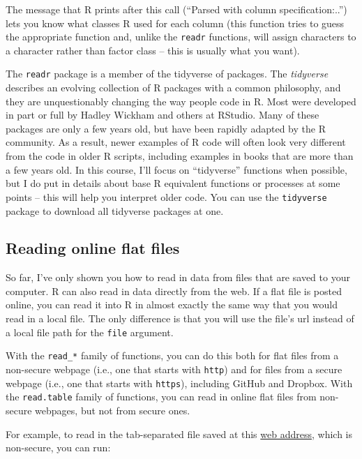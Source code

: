 \documentclass[]{book}
\makeatletter
\newenvironment{kframe}{%
\medskip{}
\setlength{\fboxsep}{.8em}
 \def\at@end@of@kframe{}%
 \ifinner\ifhmode%
  \def\at@end@of@kframe{\end{minipage}}%
  \begin{minipage}{\columnwidth}%
 \fi\fi%
 \def\FrameCommand##1{\hskip\@totalleftmargin \hskip-\fboxsep
 \colorbox{shadecolor}{##1}\hskip-\fboxsep
     \hskip-\linewidth \hskip-\@totalleftmargin \hskip\columnwidth}%
 \MakeFramed {\advance\hsize-\width
   \@totalleftmargin\z@ \linewidth\hsize
   \@setminipage}}%
 {\par\unskip\endMakeFramed%
 \at@end@of@kframe}
\newenvironment{rmdblock}[1]
  {
  \begin{itemize}
  \renewcommand{\labelitemi}{
    \raisebox{-.7\height}[0pt][0pt]{
      {\setkeys{Gin}{width=3em,keepaspectratio}\texttt{[image: images/\#1]}}
    }
  }
  \setlength{\fboxsep}{1em}
  \begin{kframe}
  \item
  }
  {
  \end{kframe}
  \end{itemize}
  }
\newenvironment{rmdnote}
  {\begin{rmdblock}{note}}
  {\end{rmdblock}}
\makeatother
\begin{document}
The message that R prints after this call (``Parsed with column
specification:..'') lets you know what classes R used for each column
(this function tries to guess the appropriate function and, unlike the
\texttt{readr} functions, will assign characters to a character rather
than factor class -- this is usually what you want).

\begin{rmdnote}
The \texttt{readr} package is a member of the tidyverse of packages. The
\emph{tidyverse} describes an evolving collection of R packages with a
common philosophy, and they are unquestionably changing the way people
code in R. Most were developed in part or full by Hadley Wickham and
others at RStudio. Many of these packages are only a few years old, but
have been rapidly adapted by the R community. As a result, newer
examples of R code will often look very different from the code in older
R scripts, including examples in books that are more than a few years
old. In this course, I'll focus on ``tidyverse'' functions when
possible, but I do put in details about base R equivalent functions or
processes at some points -- this will help you interpret older code. You
can use the \texttt{tidyverse} package to download all tidyverse
packages at one.
\end{rmdnote}

\subsection{Reading online flat files}\label{reading-online-flat-files}

So far, I've only shown you how to read in data from files that are
saved to your computer. R can also read in data directly from the web.
If a flat file is posted online, you can read it into R in almost
exactly the same way that you would read in a local file. The only
difference is that you will use the file's url instead of a local file
path for the \texttt{file} argument.

With the \texttt{read\_*} family of functions, you can do this both for
flat files from a non-secure webpage (i.e., one that starts with
\texttt{http}) and for files from a secure webpage (i.e., one that
starts with \texttt{https}), including GitHub and Dropbox. With the
\texttt{read.table} family of functions, you can read in online flat
files from non-secure webpages, but not from secure ones.

For example, to read in the tab-separated file saved at this
\href{http://www2.unil.ch/comparativegenometrics/docs/NC_006368.txt}{web
address}, which is non-secure, you can run:
\end{document}
